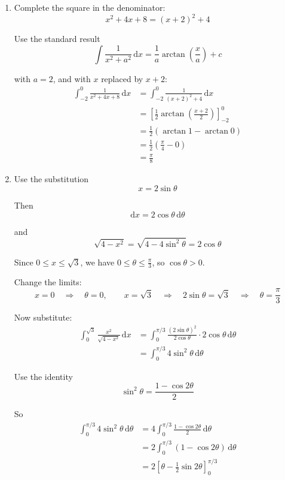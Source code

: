 \documentclass[leqno]{article}
\begin{document}
\begin{enumerate}[
  label=\textbf{\arabic*.},
  leftmargin=*,
  topsep=0pt,
  partopsep=0pt,
  parsep=0pt
]
\vspace*{10pt}

\begin{djsSolution}
\begin{enumerate}[label=\textbf{(\roman*)}]
\item Complete the square in the denominator:
\[
x^2+4x+8=(x+2)^2+4
\]

Use the standard result
\[
\int \frac{1}{x^2+a^2}\,\mathrm{d}x=\frac{1}{a}\arctan\left(\frac{x}{a}\right)+c
\]

with \(a=2\), and with \(x\) replaced by \(x+2\):
\begin{align*}
\int_{-2}^0 \frac{1}{x^2+4x+8}\,\mathrm{d}x
&=\int_{-2}^0 \frac{1}{(x+2)^2+4}\,\mathrm{d}x \\
&=\left[\frac12\arctan\left(\frac{x+2}{2}\right)\right]_{-2}^0 \\
&=\frac12\left(\arctan 1-\arctan 0\right) \\
&=\frac12\left(\frac{\pi}{4}-0\right) \\
&=\frac{\pi}{8}
\end{align*}

\item Use the substitution
\[
x=2\sin\theta
\]

Then
\[
\mathrm{d}x=2\cos\theta\,\mathrm{d}\theta
\]

and
\[
\sqrt{4-x^2}=\sqrt{4-4\sin^2\theta}=2\cos\theta
\]

Since \(0\le x\le \sqrt3\), we have \(0\le \theta\le \frac{\pi}{3}\), so \(\cos\theta>0\).

Change the limits:
\[
x=0\quad\Longrightarrow\quad\theta=0, \qquad x=\sqrt3\quad\Longrightarrow\quad2\sin\theta=\sqrt3\quad\Longrightarrow\quad\theta=\frac{\pi}{3}
\]

Now substitute:
\begin{align*}
\int_0^{\sqrt3} \frac{x^2}{\sqrt{4-x^2}}\,\mathrm{d}x
&=\int_0^{\pi/3} \frac{(2\sin\theta)^2}{2\cos\theta}\cdot 2\cos\theta\,\mathrm{d}\theta \\
&=\int_0^{\pi/3} 4\sin^2\theta\,\mathrm{d}\theta
\end{align*}

Use the identity
\[
\sin^2\theta=\frac{1-\cos 2\theta}{2}
\]

So
\begin{align*}
\int_0^{\pi/3} 4\sin^2\theta\,\mathrm{d}\theta
&=4\int_0^{\pi/3} \frac{1-\cos 2\theta}{2}\,\mathrm{d}\theta \\
&=2\int_0^{\pi/3} (1-\cos 2\theta)\,\mathrm{d}\theta \\
&=2\left[\theta-\frac12\sin 2\theta\right]_0^{\pi/3}
\end{align*}


\end{enumerate}
\end{djsSolution}
\end{enumerate}
\end{document}
